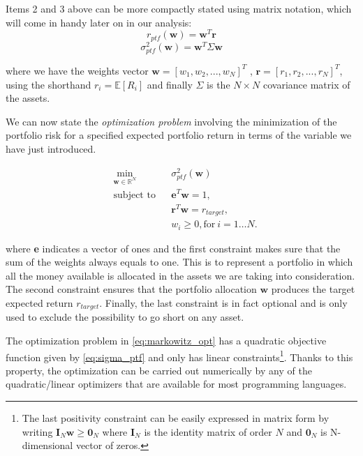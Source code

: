 Items 2 and 3 above can be more compactly stated using matrix notation, which will come in handy later on in our analysis:
\begin{equation}
\label{eq:ptf_return}
r_{ptf}(\mathbf{w}) = \mathbf{w}^T \mathbf{r}
\end{equation}
\begin{equation}
\label{eq:sigma_ptf}
	\sigma^2_{ptf}(\mathbf{w}) =  \mathbf{w}^T \Sigma \mathbf{w}
\end{equation}

where we have the weights vector $\mathbf{w} = [w_1, w_2, ... , w_N]^T$ , $\mathbf{r} = [r_1, r_2, ... , r_N]^T$, using the shorthand $r_i = \mathbb{E}[R_i]$ and finally $\Sigma$ is the $N\times N$ covariance matrix of the assets.

\bigskip

We can now state the \textit{optimization problem} involving the minimization of the portfolio risk for a specified expected portfolio return in terms of the variable we have just introduced.

\begin{subequations}
	\label{eq:markowitz_opt}
	\begin{align}
	&\!\min_{\mathbf{w}\in \mathbb{R}^{N}}     &    & \sigma^2_{ptf}(\mathbf{w}) \\
	& \text{subject to}   &   & \mathbf{e}^T\mathbf{w} = 1 ,\\
	&                 &       & \mathbf{r}^T\mathbf{w} = r_{target},\label{eq:constraint2a} \\
	&		   &      & w_{i} \geq 0, \text{for} \: i = 1\dots N. 
	\end{align}
\end{subequations}

where \textbf{e} indicates a vector of ones and the first constraint makes sure that the sum of the weights always equals to one. This is to represent a portfolio in which all the money available is allocated in the assets we are taking into consideration.
The second constraint ensures that the portfolio allocation $\mathbf{w}$ produces the target expected return $r_{target}$.
Finally, the last constraint is in fact optional and is only used to exclude the possibility to go short on any asset.

The optimization problem in \eqref{eq:markowitz_opt} has a quadratic objective function given by \eqref{eq:sigma_ptf} and only has linear constraints\footnote{The last positivity constraint can be easily expressed in matrix form by writing $ \mathbf{I}_N\mathbf{w} \geq \mathbf{0}_N$ where $\mathbf{I}_N$ is the identity matrix of order $N$ and $\mathbf{0}_N$ is N-dimensional vector of zeros.}. Thanks to this property, the optimization can be carried out numerically by any of the quadratic/linear optimizers that are available for most programming languages.

